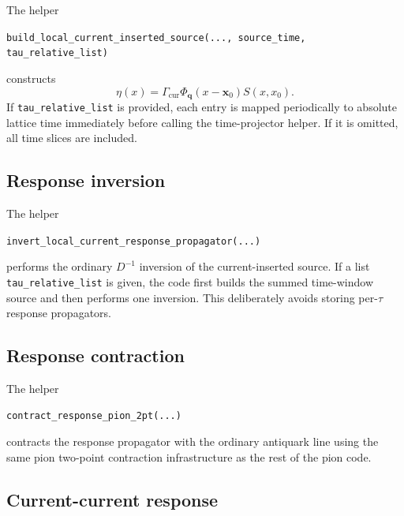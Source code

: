 \documentclass[11pt,a4paper]{article}
\newcommand{\Dslash}{D}
\begin{document}
The helper
\begin{center}
\texttt{build\_local\_current\_inserted\_source(..., source\_time, tau\_relative\_list)}
\end{center}
constructs
\begin{equation}
  \eta(x)
  =
  \Gamma_{\mathrm{cur}}\Phi_{\mathbf q}(x-\mathbf x_0)S(x,x_0).
\end{equation}
If \texttt{tau\_relative\_list} is provided, each entry is mapped periodically
to absolute lattice time immediately before calling the time-projector helper.
If it is omitted, all time slices are included.

\subsection{Response inversion}

The helper
\begin{center}
\texttt{invert\_local\_current\_response\_propagator(...)}
\end{center}
performs the ordinary \(\Dslash^{-1}\) inversion of the current-inserted
source.  If a list \texttt{tau\_relative\_list} is given, the code first builds
the summed time-window source and then performs one inversion.  This deliberately
avoids storing per-\(\tau\) response propagators.

\subsection{Response contraction}

The helper
\begin{center}
\texttt{contract\_response\_pion\_2pt(...)}
\end{center}
contracts the response propagator with the ordinary antiquark line using the
same pion two-point contraction infrastructure as the rest of the pion code.

\subsection{Current-current response}
\end{document}

